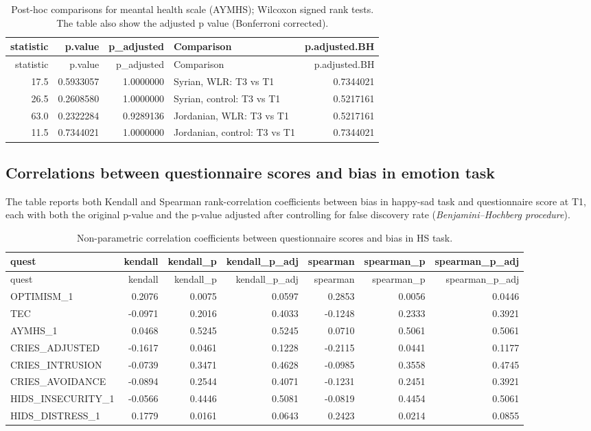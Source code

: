 \documentclass[]{article}
\begin{document}
\begin{longtable}[]{@{}rrrlr@{}}
\caption{Post-hoc comparisons for meantal health scale (AYMHS); Wilcoxon
signed rank tests. The table also show the adjusted p value (Bonferroni
corrected).}\tabularnewline
\toprule
statistic & p.value & p\_adjusted & Comparison &
p.adjusted.BH\tabularnewline
\midrule
\endfirsthead
\toprule
statistic & p.value & p\_adjusted & Comparison &
p.adjusted.BH\tabularnewline
\midrule
\endhead
17.5 & 0.5933057 & 1.0000000 & Syrian, WLR: T3 vs T1 &
0.7344021\tabularnewline
26.5 & 0.2608580 & 1.0000000 & Syrian, control: T3 vs T1 &
0.5217161\tabularnewline
63.0 & 0.2322284 & 0.9289136 & Jordanian, WLR: T3 vs T1 &
0.5217161\tabularnewline
11.5 & 0.7344021 & 1.0000000 & Jordanian, control: T3 vs T1 &
0.7344021\tabularnewline
\bottomrule
\end{longtable}

\newpage

\hypertarget{correlations-between-questionnaire-scores-and-bias-in-emotion-task}{%
\subsection{Correlations between questionnaire scores and bias in
emotion
task}\label{correlations-between-questionnaire-scores-and-bias-in-emotion-task}}

The table reports both Kendall and Spearman rank-correlation
coefficients between bias in happy-sad task and questionnaire score at
T1, each with both the original p-value and the p-value adjusted after
controlling for false discovery rate (\emph{Benjamini--Hochberg
procedure}).

\begin{longtable}[]{@{}lrrrrrr@{}}
\caption{Non-parametric correlation coefficients between questionnaire
scores and bias in HS task.}\tabularnewline
\toprule
quest & kendall & kendall\_p & kendall\_p\_adj & spearman & spearman\_p
& spearman\_p\_adj\tabularnewline
\midrule
\endfirsthead
\toprule
quest & kendall & kendall\_p & kendall\_p\_adj & spearman & spearman\_p
& spearman\_p\_adj\tabularnewline
\midrule
\endhead
OPTIMISM\_1 & 0.2076 & 0.0075 & 0.0597 & 0.2853 & 0.0056 &
0.0446\tabularnewline
TEC & -0.0971 & 0.2016 & 0.4033 & -0.1248 & 0.2333 &
0.3921\tabularnewline
AYMHS\_1 & 0.0468 & 0.5245 & 0.5245 & 0.0710 & 0.5061 &
0.5061\tabularnewline
CRIES\_ADJUSTED & -0.1617 & 0.0461 & 0.1228 & -0.2115 & 0.0441 &
0.1177\tabularnewline
CRIES\_INTRUSION & -0.0739 & 0.3471 & 0.4628 & -0.0985 & 0.3558 &
0.4745\tabularnewline
CRIES\_AVOIDANCE & -0.0894 & 0.2544 & 0.4071 & -0.1231 & 0.2451 &
0.3921\tabularnewline
HIDS\_INSECURITY\_1 & -0.0566 & 0.4446 & 0.5081 & -0.0819 & 0.4454 &
0.5061\tabularnewline
HIDS\_DISTRESS\_1 & 0.1779 & 0.0161 & 0.0643 & 0.2423 & 0.0214 &
0.0855\tabularnewline
\bottomrule
\end{longtable}
\end{document}
